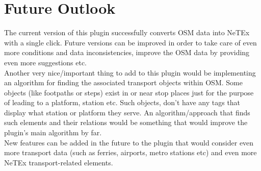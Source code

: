 \section*{Future Outlook}
The current version of this plugin successfully converts OSM data into NeTEx with a single click. Future versions can be improved in order to take care of even more conditions and data inconsistencies, improve the OSM data by providing even more suggestions etc.\\
\newline
Another very nice/important thing to add to this plugin would be implementing an algorithm for finding the associated transport objects within OSM. Some objects (like footpaths or steps) exist in or near stop places just for the purpose of leading to a platform, station etc. Such objects, don't have any tags that display what station or platform they serve. An algorithm/approach that finds such elements and their relations would be something that would improve the plugin's main algorithm by far.\\
\newline
New features can be added in the future to the plugin that would consider even more transport data (such as ferries, airports, metro stations etc) and even more NeTEx transport-related elements.